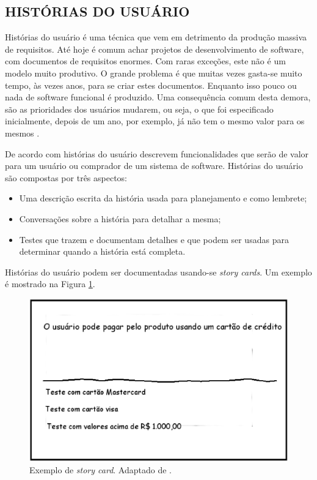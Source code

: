 \subsection{HISTÓRIAS DO USUÁRIO}
\label{user_stories_sec}

Histórias do usuário é uma técnica que vem em detrimento da produção massiva de requisitos. 
Até hoje é comum achar projetos de desenvolvimento de software, com documentos de requisitos enormes. 
Com raras exceções, este não é um modelo muito produtivo. 
O grande problema é que muitas vezes gasta-se muito tempo, às vezes anos, para se criar estes documentos. 
Enquanto isso pouco ou nada de software funcional é produzido. 
Uma consequência comum desta demora, são as prioridades dos usuários mudarem, ou seja, o que foi especificado inicialmente, depois de um ano, por exemplo, já não tem o mesmo valor para os mesmos \cite{Patton2014}.

De acordo com  histórias do usuário descrevem funcionalidades que serão de valor para um usuário ou comprador de um sistema de software. Histórias do usuário são compostas por três aspectos: 
\begin{itemize}
	\item Uma descrição escrita da história usada para planejamento e como lembrete;
	\item Conversações sobre a história para detalhar a mesma;
	\item Testes que trazem e documentam detalhes e que podem ser usadas para determinar quando a história está completa.
\end{itemize}

Histórias do usuário podem ser documentadas usando-se \emph{story cards}. Um exemplo é mostrado na Figura \ref{story_card}.
\begin{figure}[ht]
	\centering
	\includegraphics[width=15 cm]{figuras/story_card.eps}
	\caption{Exemplo de \emph{story card}. Adaptado de \cite{cohn2004}.}
    	\label{story_card}
\end{figure}

